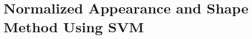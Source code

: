 \documentclass[Main]{subfiles}
\begin{document}
\section{Normalized Appearance and Shape Method Using SVM} %
	\label{sec:normalized_appearance_and_shape_method_using_svm}


\end{document}
